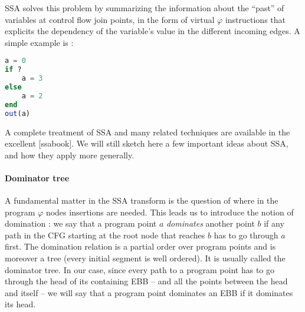 \documentclass[14pt]{article}
\renewcommand{\phi}{\varphi}
\begin{document}
SSA solves this problem by summarizing the information about the ``past'' of variables at control flow join points, in the form of virtual $\phi$ instructions that explicits the dependency of the variable's value in the different incoming edges. A simple example is :

\begin{minipage}[t]{0.20\linewidth}
\begin{lstlisting}[language=julia]
a = 0
if ?
    a = 3
else
    a = 2
end
out(a)
\end{lstlisting}
\end{minipage}
\begin{minipage}[t]{0.30\linewidth}
\null
{}
\end{minipage}

A complete treatment of SSA and many related techniques are available in the excellent [ssabook]. We will still sketch here a few important ideas about SSA, and how they apply more generally.

\paragraph{Dominator tree} A fundamental matter in the SSA transform is the question of where in the program $\phi$ nodes insertions are needed.
This leads us to introduce the notion of domination : we say that a program point $a$ \emph{dominates} another point $b$ if any path in the CFG starting at the root node that reaches $b$ has to go through $a$ first. The domination relation is a partial order over program points and is moreover a tree (every initial segment is well ordered). It is usually called the dominator tree. In our case, since every path to a program point has to go through the head of its containing EBB -- and all the points between the head and itself -- we will say that a program point dominates an EBB if it dominates its head.
\end{document}
